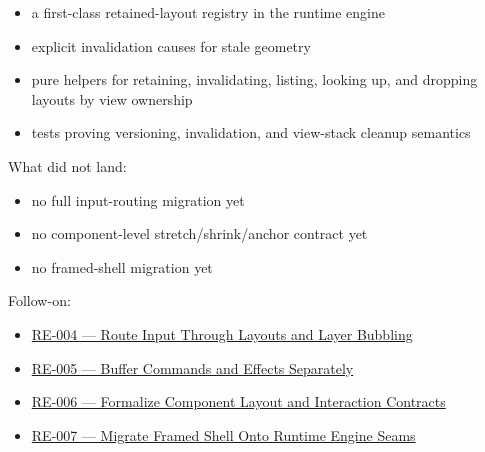 \begin{itemize}
\tightlist
\item
  a first-class retained-layout registry in the runtime engine
\item
  explicit invalidation causes for stale geometry
\item
  pure helpers for retaining, invalidating, listing, looking up, and dropping layouts by view ownership
\item
  tests proving versioning, invalidation, and view-stack cleanup semantics
\end{itemize}

What did not land:

\begin{itemize}
\tightlist
\item
  no full input-routing migration yet
\item
  no component-level stretch/shrink/anchor contract yet
\item
  no framed-shell migration yet
\end{itemize}

Follow-on:

\begin{itemize}
\tightlist
\item
  \href{https://github.com/flyingrobots/bijou/blob/cbd70612140e7a450d764b3c7be1c6af878b99bc/docs/design/RE-004-route-input-through-layouts-and-layer-bubbling.md}{RE-004 --- Route Input Through Layouts and Layer Bubbling}
\item
  \href{https://github.com/flyingrobots/bijou/blob/cbd70612140e7a450d764b3c7be1c6af878b99bc/docs/design/RE-005-buffer-commands-and-effects-separately.md}{RE-005 --- Buffer Commands and Effects Separately}
\item
  \href{https://github.com/flyingrobots/bijou/blob/cbd70612140e7a450d764b3c7be1c6af878b99bc/docs/design/RE-006-formalize-component-layout-and-interaction-contracts.md}{RE-006 --- Formalize Component Layout and Interaction Contracts}
\item
  \href{https://github.com/flyingrobots/bijou/blob/cbd70612140e7a450d764b3c7be1c6af878b99bc/docs/method/graveyard/legacy-backlog/up-next/RE-007-migrate-framed-shell-onto-runtime-engine-seams.md}{RE-007 --- Migrate Framed Shell Onto Runtime Engine Seams}
\end{itemize}

